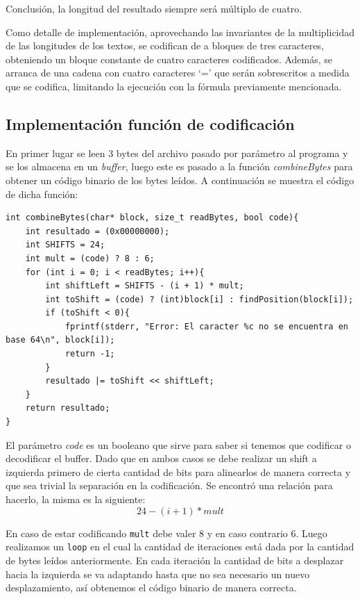 \documentclass[titlepage,a4paper]{article}
\begin{document}
Conclusión, la longitud del resultado siempre será múltiplo de cuatro.

Como detalle de implementación, aprovechando las invariantes de la multiplicidad de las longitudes de los textos, se codifican de a bloques de tres caracteres, obteniendo un bloque constante de cuatro caracteres codificados. Además, se arranca de una cadena con cuatro caracteres `=' que serán sobrescritos a medida que se codifica, limitando la ejecución con la fórmula previamente mencionada.


\subsection{Implementación función de codificación}

En primer lugar se leen 3 bytes del archivo pasado por parámetro al programa y se los almacena en un \textit{buffer}, luego este es pasado a la función \textit{combineBytes} para obtener un código binario de los bytes leídos. A continuación se muestra el código de dicha función:

\begin{lstlisting}[style=customC]
int combineBytes(char* block, size_t readBytes, bool code){
	int resultado = (0x00000000);
	int SHIFTS = 24;
	int mult = (code) ? 8 : 6;
	for (int i = 0; i < readBytes; i++){
		int shiftLeft = SHIFTS - (i + 1) * mult;
		int toShift = (code) ? (int)block[i] : findPosition(block[i]);
		if (toShift < 0){
			fprintf(stderr, "Error: El caracter %c no se encuentra en base 64\n", block[i]);
			return -1;
		}
		resultado |= toShift << shiftLeft;
	}
	return resultado;
}
\end{lstlisting}

El parámetro \textit{code} es un booleano que sirve para saber si tenemos que codificar o decodificar el buffer. Dado que en ambos casos se debe realizar un shift a izquierda primero de cierta cantidad de bits para alinearlos de manera correcta y que sea trivial la separación en la codificación. Se encontró una relación para hacerlo, la misma es la siguiente: $$ 24 - (i + 1) * mult $$

En caso de estar codificando \verb|mult| debe valer 8 y en caso contrario 6. Luego realizamos un \verb|loop| en el cual la cantidad de iteraciones está dada por la cantidad de bytes leídos anteriormente. En cada iteración la cantidad de bits a desplazar hacia la izquierda se va adaptando hasta que no sea necesario un nuevo desplazamiento, así obtenemos el código binario de manera correcta. \newline
\end{document}
